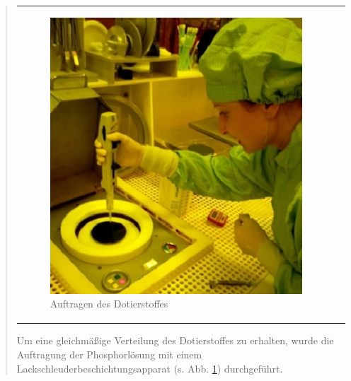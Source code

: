 \begin{quote}
\begin{center}
\begin{tabular}{ll}
\begin{minipage}{0.6\textwidth}
                        \begin{figure}[H]
                        \hspace{3.5em}
                            \includegraphics[scale=0.7, trim = 0cm 0cm 0cm
                            0cm, clip]{./HerstellungBilder/Dotierstoffauftragen.png}
                            \caption{Auftragen des Dotierstoffes}
                           \label{fig:aufDot}
                        \end{figure}
                    \vspace{-1.5em}

                    \end{minipage}

                \end{tabular}
		\end{center}

    	\vspace{2em}

		Um eine gleichmäßige Verteilung des Dotierstoffes zu erhalten, wurde die
		Auftragung der Phosphorlösung mit einem
		Lackschleuderbeschichtungsapparat (s. Abb. \ref{fig:aufDot})
		durchgeführt.\\
		

\end{quote}
